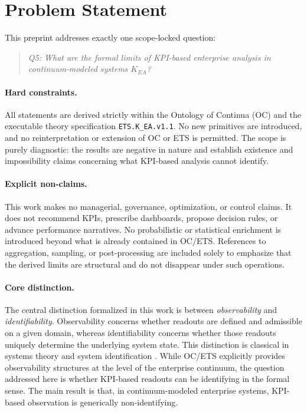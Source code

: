 ﻿\section{Problem Statement}

This preprint addresses exactly one scope-locked question:

\begin{quote}
\emph{Q5: What are the formal limits of KPI-based enterprise analysis in
continuum-modeled systems \(K_{EA}\)?}
\end{quote}

\paragraph{Hard constraints.}
All statements are derived strictly within the Ontology of Continua (OC) and the
executable theory specification \texttt{ETS.K\_EA.v1.1}.
No new primitives are introduced, and no reinterpretation or extension of OC or
ETS is permitted.
The scope is purely diagnostic: the results are negative in nature and establish
existence and impossibility claims concerning what KPI-based analysis cannot
identify.

\paragraph{Explicit non-claims.}
This work makes no managerial, governance, optimization, or control claims.
It does not recommend KPIs, prescribe dashboards, propose decision rules, or
advance performance narratives.
No probabilistic or statistical enrichment is introduced beyond what is already
contained in OC/ETS.
References to aggregation, sampling, or post-processing are included solely to
emphasize that the derived limits are structural and do not disappear under such
operations.

\paragraph{Core distinction.}
The central distinction formalized in this work is between
\emph{observability} and \emph{identifiability}.
Observability concerns whether readouts are defined and admissible on a given
domain, whereas identifiability concerns whether those readouts uniquely
determine the underlying system state.
This distinction is classical in systems theory and system identification
\cite{kalman1960,ljung1999,walter1997}.
While OC/ETS explicitly provides observability structures at the level of the
enterprise continuum, the question addressed here is whether KPI-based readouts
can be identifying in the formal sense.
The main result is that, in continuum-modeled enterprise systems,
KPI-based observation is generically non-identifying.

